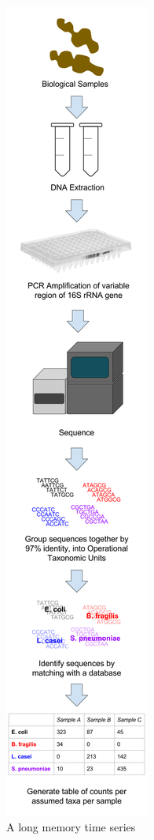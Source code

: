 \begin{figure}[h]
\begin{center}
\includegraphics[height=0.8\textheight]{16S_rRNA_pipeline.png}
\caption{A long memory time series\label{ts1}}
\end{center}
\end{figure}

